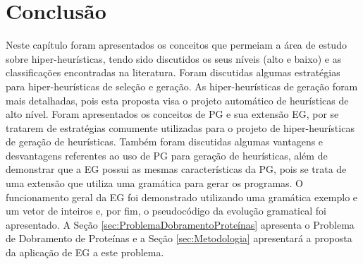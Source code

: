 \section{Conclusão}
\label{ReferencialTeorico:Conclusão}

Neste capítulo foram apresentados os conceitos que permeiam a área de estudo sobre hiper-heurísticas, tendo sido discutidos os seus níveis (alto e baixo) e as classificações encontradas na literatura.  Foram discutidas algumas estratégias para hiper-heurísticas de seleção e geração. As hiper-heurísticas de geração foram mais detalhadas, pois esta proposta visa o projeto  automático de heurísticas de alto nível. Foram apresentados os conceitos de PG e sua extensão EG, por se tratarem de estratégias comumente utilizadas para o projeto de hiper-heurísticas de geração de heurísticas. Também foram discutidas algumas vantagens e desvantagens referentes ao uso de PG para geração de heurísticas, além de demonstrar que a EG possui as mesmas características da PG, pois se trata de uma extensão que utiliza uma gramática para gerar os programas. O funcionamento geral da EG foi demonstrado utilizando uma gramática exemplo e um vetor de inteiros e, por fim, o pseudocódigo da evolução gramatical foi apresentado. A Seção \ref{sec:ProblemaDobramentoProteínas} apresenta o Problema de Dobramento de Proteínas e a Seção \ref{sec:Metodologia} apresentará a proposta da aplicação de EG a este problema.





